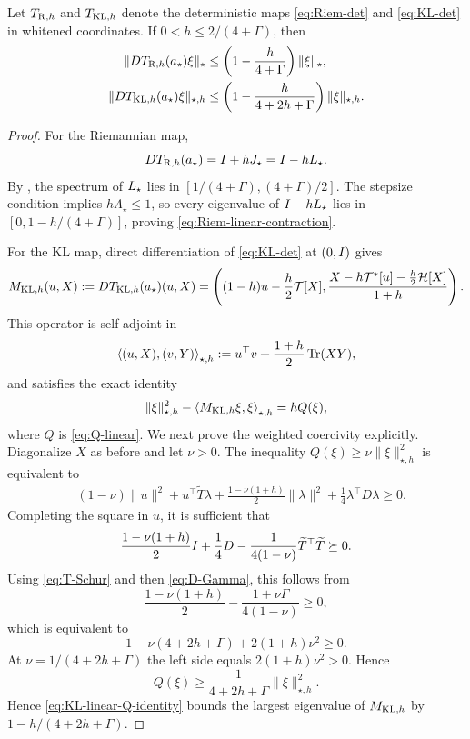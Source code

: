 \begin{proposition}
\label{prop:linearized-maps}
Let $T_{\mathrm{R},h}$ and $T_{\mathrm{KL},h}$ denote the deterministic maps
\eqref{eq:Riem-det} and \eqref{eq:KL-det} in whitened coordinates.  If
$0<h\leq2/(4+\Gamma)$, then
\begin{align}
\label{eq:Riem-linear-contraction}
    \|DT_{\mathrm{R},h}(a_\star)\xi\|_\star
    &\leq
    \left(1-\frac h{4+\Gamma}\right)\|\xi\|_\star,\\
\label{eq:KL-linear-contraction}
    \|DT_{\mathrm{KL},h}(a_\star)\xi\|_{\star,h}
    &\leq
    \left(1-\frac h{4+2h+\Gamma}\right)\|\xi\|_{\star,h}.
\end{align}
\end{proposition}

\begin{proof}
For the Riemannian map,
\[
    DT_{\mathrm{R},h}(a_\star)=I+hJ_\star=I-hL_\star.
\]
By , the spectrum of $L_\star$ lies in
$[1/(4+\Gamma),(4+\Gamma)/2]$.  The stepsize condition implies
$h\Lambda_\star\leq1$, so every eigenvalue of $I-hL_\star$ lies in
$[0,1-h/(4+\Gamma)]$, proving \eqref{eq:Riem-linear-contraction}.

For the KL map, direct differentiation of \eqref{eq:KL-det} at $(0,I)$ gives
\begin{equation}
\label{eq:KL-linear-map-formula}
    M_{\mathrm{KL},h}(u,X)
    :=DT_{\mathrm{KL},h}(a_\star)(u,X)
    =\left(
       (1-h)u-\frac h2\mathcal T[X],
       \frac{X-h\mathcal T^*[u]-\frac h2\mathcal H[X]}{1+h}
    \right).
\end{equation}
This operator is self-adjoint in
\[
    \left\langle (u,X),(v,Y)\right\rangle_{\star,h}
    :=u^\top v+\frac{1+h}{2}\operatorname{Tr}(XY),
\]
and satisfies the exact identity
\begin{equation}
\label{eq:KL-linear-Q-identity}
    \|\xi\|_{\star,h}^2
      -\left\langle M_{\mathrm{KL},h}\xi,\xi\right\rangle_{\star,h}
    =hQ(\xi),
\end{equation}
where $Q$ is \eqref{eq:Q-linear}.  We next prove the weighted coercivity explicitly.  Diagonalize $X$ as before and let
$\nu>0$.  The inequality
$Q(\xi)\geq\nu\|\xi\|_{\star,h}^2$ is equivalent to
\[
\begin{aligned}
    &(1-\nu)\|u\|^2+u^\top\widetilde T\lambda
    +\frac{1-\nu(1+h)}2\|\lambda\|^2
    +\frac14\lambda^\top D\lambda\geq0.
\end{aligned}
\]
Completing the square in $u$, it is sufficient that
\[
    \frac{1-\nu(1+h)}2I+\frac14D
    -\frac1{4(1-\nu)}\widetilde T^\top\widetilde T\succeq0.
\]
Using \eqref{eq:T-Schur} and then \eqref{eq:D-Gamma}, this follows from
\[
    \frac{1-\nu(1+h)}2-\frac{1+\nu\Gamma}{4(1-\nu)}\geq0,
\]
which is equivalent to
\[
    1-\nu(4+2h+\Gamma)+2(1+h)\nu^2\geq0.
\]
At $\nu=1/(4+2h+\Gamma)$ the left side equals $2(1+h)\nu^2>0$.  Hence
\[
    Q(\xi)\geq\frac1{4+2h+\Gamma}\|\xi\|_{\star,h}^2.
\]  Hence \eqref{eq:KL-linear-Q-identity} bounds the largest eigenvalue of
$M_{\mathrm{KL},h}$ by $1-h/(4+2h+\Gamma)$.


\end{proof}
